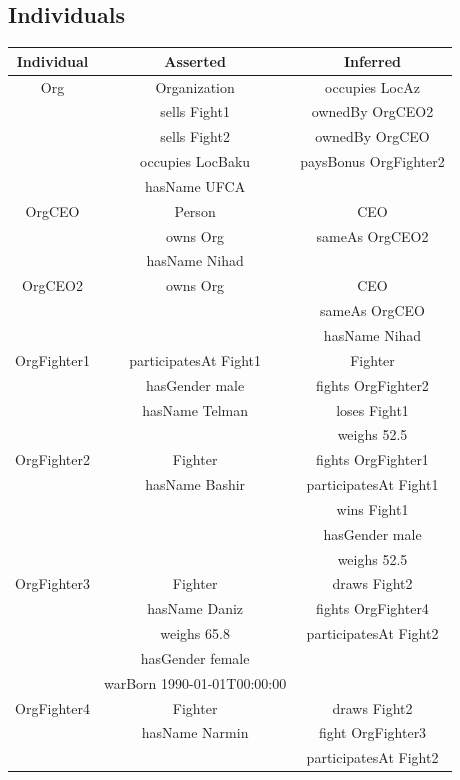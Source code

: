 \documentclass[a4paper]{article}
\begin{document}
\begin{appendix}
	\section{Individuals}
	\label{appendix:individuals}
	\begin{table}[H]
		\centering
		\begin{tabular}{|c|c|c|}
			\hline
			\textbf{Individual} & \textbf{Asserted} & \textbf{Inferred} \\
			\hline
			Org & Organization & occupies LocAz \\
				& sells Fight1 & ownedBy OrgCEO2 \\
				& sells Fight2 & ownedBy OrgCEO \\
				& occupies LocBaku & paysBonus OrgFighter2 \\
				& hasName UFCA & \\
			\hline
			OrgCEO & Person & CEO \\
				& owns Org & sameAs OrgCEO2 \\
				& hasName Nihad & \\
			\hline
			OrgCEO2 & owns Org & CEO \\
				& & sameAs OrgCEO \\
				& & hasName Nihad \\
			\hline
			OrgFighter1 & participatesAt Fight1 & Fighter \\
				& hasGender male & fights OrgFighter2 \\
				& hasName Telman & loses Fight1 \\
				& & weighs 52.5 \\
			\hline
			OrgFighter2 & Fighter & fights OrgFighter1 \\
				& hasName Bashir & participatesAt Fight1 \\
				& & wins Fight1 \\
				& & hasGender male \\
				& & weighs 52.5 \\
			\hline
			OrgFighter3 & Fighter & draws Fight2 \\
				& hasName Daniz & fights OrgFighter4 \\
				& weighs 65.8 & participatesAt Fight2 \\
				& hasGender female & \\
				& warBorn 1990-01-01T00:00:00 & \\
			\hline
			OrgFighter4 & Fighter & draws Fight2 \\
				& hasName Narmin & fight OrgFighter3 \\
				& & participatesAt Fight2 \\

\end{tabular}
\end{table}
\end{appendix}
\end{document}
